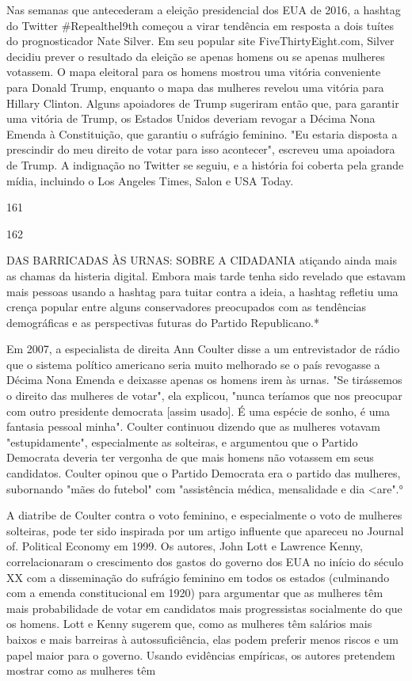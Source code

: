 Nas semanas que antecederam a eleição presidencial dos EUA de 2016, a hashtag do Twitter #Repealthel9th começou a virar tendência em resposta a dois tuítes do prognosticador Nate Silver. Em seu popular site FiveThirtyEight.com, Silver decidiu prever o resultado da eleição se apenas homens ou se apenas mulheres votassem. O mapa eleitoral para os homens mostrou uma vitória conveniente para Donald Trump, enquanto o mapa das mulheres revelou uma vitória para Hillary Clinton. Alguns apoiadores de Trump sugeriram então que, para garantir uma vitória de Trump, os Estados Unidos deveriam revogar a Décima Nona Emenda à Constituição, que garantiu o sufrágio feminino. "Eu estaria disposta a prescindir do meu direito de votar para isso acontecer", escreveu uma apoiadora de Trump. A indignação no Twitter se seguiu, e a história foi coberta pela grande mídia, incluindo o Los Angeles Times, Salon e USA Today.
 \par 
161
 \par 
162
 \par 
DAS BARRICADAS ÀS URNAS: SOBRE A CIDADANIA atiçando ainda mais as chamas da histeria digital. Embora mais tarde tenha sido revelado que estavam mais pessoas usando a hashtag para tuitar contra a ideia, a hashtag refletiu uma crença popular entre alguns conservadores preocupados com as tendências demográficas e as perspectivas futuras do Partido Republicano.*
 \par 
Em 2007, a especialista de direita Ann Coulter disse a um entrevistador de rádio que o sistema político americano seria muito melhorado se o país revogasse a Décima Nona Emenda e deixasse apenas os homens irem às urnas. "Se tirássemos o direito das mulheres de votar", ela explicou, "nunca teríamos que nos preocupar com outro presidente democrata [assim usado]. É uma espécie de sonho, é uma fantasia pessoal minha". Coulter continuou dizendo que as mulheres votavam "estupidamente", especialmente as solteiras, e argumentou que o Partido Democrata deveria ter vergonha de que mais homens não votassem em seus candidatos. Coulter opinou que o Partido Democrata era o partido das mulheres, subornando "mães do futebol" com "assistência médica, mensalidade e dia <are".°
 \par 
A diatribe de Coulter contra o voto feminino, e especialmente o voto de mulheres solteiras, pode ter sido inspirada por um artigo influente que apareceu no Journal of. Political Economy em 1999. Os autores, John Lott e Lawrence Kenny, correlacionaram o crescimento dos gastos do governo dos EUA no início do século XX com a disseminação do sufrágio feminino em todos os estados (culminando com a emenda constitucional em 1920) para argumentar que as mulheres têm mais probabilidade de votar em candidatos mais progressistas socialmente do que os homens. Lott e Kenny sugerem que, como as mulheres têm salários mais baixos e mais barreiras à autossuficiência, elas podem preferir menos riscos e um papel maior para o governo. Usando evidências empíricas, os autores pretendem mostrar como as mulheres têm
